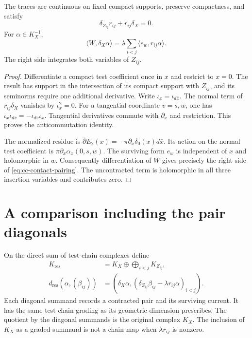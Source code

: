 \begin{lemma}
\label{lem:cc-residue-trace}
The traces are continuous on fixed compact supports, preserve compactness,
and satisfy
\[
 \delta_{Z_{ij}}r_{ij}+r_{ij}\delta_X=0.
\]
For $\alpha\in K_X^{-1}$,
\begin{equation}
\label{eq:cc-contact-pairing}
 \langle W,\delta_X\alpha\rangle
   =\lambda\sum_{i<j}\langle e_w,r_{ij}\alpha\rangle.
\end{equation}
The right side integrates both variables of $Z_{ij}$.
\end{lemma}
\begin{proof}
Differentiate a compact test coefficient once in $x$ and restrict to
$x=0$.  The result has support in the intersection of its compact support
with $Z_{ij}$, and its seminorms require one additional derivative.
Write $\iota_x=\iota_{d\bar x}$.  The normal term of
$r_{ij}\delta_X$ vanishes by $\iota_x^2=0$.
For a tangential coordinate $v=s,w$, one has
$\iota_x\iota_{d\bar v}=-\iota_{d\bar v}\iota_x$.
Tangential derivatives commute with $\partial_x$ and restriction.
This proves the anticommutation identity.

The normalized residue is
$\bar\partial E_2(x)=-\pi\partial_x\delta_0(x)d\bar x$.
Its action on the normal test coefficient is
$\pi\partial_x\alpha_x(0,s,w)$.
The surviving form $e_w$ is independent of $x$ and holomorphic in $w$.
Consequently differentiation of $W$ gives precisely the right side of
\eqref{eq:cc-contact-pairing}.  The uncontracted term is holomorphic in
all three insertion variables and contributes zero.
\end{proof}

\section{A comparison including the pair diagonals}

On the direct sum of test-chain complexes define
\begin{equation}
\label{eq:cc-source}
 \begin{split}
 K_{\mathrm{res}}&=K_X\oplus\bigoplus_{i<j}K_{Z_{ij}},\\
 d_{\mathrm{res}}(\alpha,(\beta_{ij}))
  &=\left(\delta_X\alpha,
       (\delta_{Z_{ij}}\beta_{ij}-\lambda r_{ij}\alpha)_{i<j}\right).
 \end{split}
\end{equation}
Each diagonal summand records a contracted pair and its surviving current.
It has the same test-chain grading as its geometric dimension prescribes.
The quotient by the diagonal summands is the original complex $K_X$.
The inclusion of $K_X$ as a graded summand is not a chain map when
$\lambda r_{ij}$ is nonzero.

